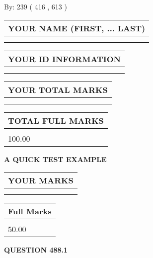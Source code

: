 \documentclass[12pt]{article}
\begin{document}
   
\hspace{1.0in} By: 
 239 ( 416 ,  613 )
   
   
   
   
\newpage 
\setcounter{page}{ 
   488001 } 
   
   
   
   
\noindent\begin{tabular}{|l|}
\hline
YOUR NAME (FIRST, ... LAST)  \\
\hline
 \\ 
 \\ 
\hline
\end{tabular}
\hspace{0.05in} \begin{tabular}{|l|}
\hline
 YOUR   ID   INFORMATION  \\
\hline
 \\ 
 \\ 
\hline
\end{tabular}
   
   
\vspace{0.2in}\noindent\begin{tabular}{|l|}
\hline
YOUR TOTAL MARKS  \\
\hline
 \\ 
 \\ 
\hline
\end{tabular}
\hspace{0.05in} \begin{tabular}{|l|}
\hline
TOTAL FULL MARKS  \\
\hline
 \\ 
100.00 \\
\hline
\end{tabular}
   
   
 \vspace{0.2in}
{\LARGE {\textbf{ A QUICK TEST EXAMPLE}}}
   
   
  
\vspace{0.2in}
  
\noindent\begin{tabular}{|l|}
\hline
 YOUR MARKS  \\
\hline
 \\ 
 \\ 
\hline
\end{tabular}
\hspace{0.05in} \begin{tabular}{|l|}
\hline
 Full Marks  \\
\hline
 \\ 
50.00 \\
\hline
\end{tabular}
{\textbf{\Large{QUESTION
488.1 
}}}
  
\end{document}
